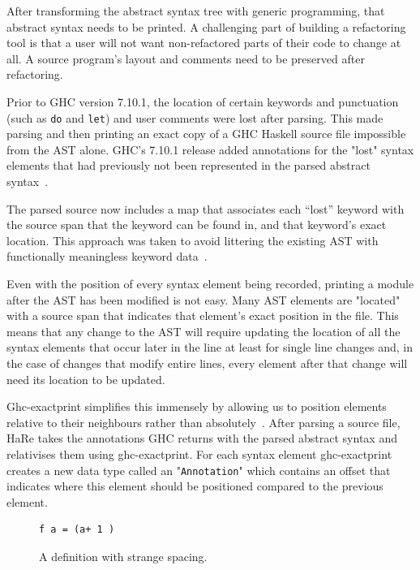 After transforming the abstract syntax tree with generic programming, that abstract syntax needs to be printed. A challenging part of building a refactoring tool is that a user will not want non-refactored parts of their code to change at all. A source program's layout and comments need to be preserved after refactoring. 

Prior to GHC version 7.10.1, the location of certain keywords and punctuation (such as \texttt{do} and \texttt{let}) and user comments were lost after parsing. This made parsing and then printing an exact copy of a GHC Haskell source file impossible from the AST alone. GHC's 7.10.1 release added annotations for the "lost" syntax elements that had previously not been represented in the parsed abstract syntax~\citep{apiAnns}. 

The parsed source now includes a map that associates each ``lost'' keyword with the source span that the keyword can be found in, and that keyword's exact location. This approach was taken to avoid littering the existing AST with functionally meaningless keyword data~\citep{apiAnns}. 

Even with the position of every syntax element being recorded, printing a module after the AST has been modified is not easy. Many AST elements are "located" with a source span that indicates that element's exact position in the file. This means that any change to the AST will require updating the location of all the syntax elements that occur later in the line at least for single line changes and, in the case of changes that modify entire lines, every element after that change will need its location to be updated.

Ghc-exactprint simplifies this immensely by allowing us to position elements relative to their neighbours rather than absolutely~\citep{exactprint}. After parsing a source file, HaRe takes the annotations GHC returns with the parsed abstract syntax and relativises them using ghc-exactprint. For each syntax element ghc-exactprint creates a new data type called an "\texttt{Annotation}" which contains an offset that indicates where this element should be positioned compared to the previous element.

\begin{figure}[t]
\begin{lstlisting} 
f a = (a+ 1 )
\end{lstlisting}
\caption{A definition with strange spacing.}
\label{strangeSpacing}
\end{figure}


